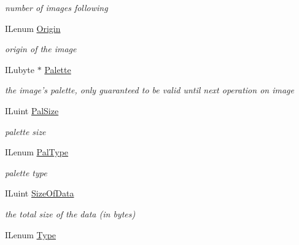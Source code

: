 \begin{DoxyCompactItemize}
\begin{DoxyCompactList}\small\item\em number of images following \end{DoxyCompactList}\item 
\hypertarget{struct_i_l_uinfo_a6f7c49ddc9cd419e2d2af24255df902a}{I\+Lenum \hyperlink{struct_i_l_uinfo_a6f7c49ddc9cd419e2d2af24255df902a}{Origin}}\label{struct_i_l_uinfo_a6f7c49ddc9cd419e2d2af24255df902a}

\begin{DoxyCompactList}\small\item\em origin of the image \end{DoxyCompactList}\item 
\hypertarget{struct_i_l_uinfo_ab520cff305ed9ee13d2eac7a87ac1d92}{I\+Lubyte $\ast$ \hyperlink{struct_i_l_uinfo_ab520cff305ed9ee13d2eac7a87ac1d92}{Palette}}\label{struct_i_l_uinfo_ab520cff305ed9ee13d2eac7a87ac1d92}

\begin{DoxyCompactList}\small\item\em the image's palette, only guaranteed to be valid until next operation on image \end{DoxyCompactList}\item 
\hypertarget{struct_i_l_uinfo_a728a63d4c8b857a800a4d19e250a8c4b}{I\+Luint \hyperlink{struct_i_l_uinfo_a728a63d4c8b857a800a4d19e250a8c4b}{Pal\+Size}}\label{struct_i_l_uinfo_a728a63d4c8b857a800a4d19e250a8c4b}

\begin{DoxyCompactList}\small\item\em palette size \end{DoxyCompactList}\item 
\hypertarget{struct_i_l_uinfo_ab091aab8d79003031a4e9957e85f43ca}{I\+Lenum \hyperlink{struct_i_l_uinfo_ab091aab8d79003031a4e9957e85f43ca}{Pal\+Type}}\label{struct_i_l_uinfo_ab091aab8d79003031a4e9957e85f43ca}

\begin{DoxyCompactList}\small\item\em palette type \end{DoxyCompactList}\item 
\hypertarget{struct_i_l_uinfo_ad3bfe4c8a6696b42835730f7b70327b7}{I\+Luint \hyperlink{struct_i_l_uinfo_ad3bfe4c8a6696b42835730f7b70327b7}{Size\+Of\+Data}}\label{struct_i_l_uinfo_ad3bfe4c8a6696b42835730f7b70327b7}

\begin{DoxyCompactList}\small\item\em the total size of the data (in bytes) \end{DoxyCompactList}\item 
\hypertarget{struct_i_l_uinfo_a437e4fc3b579e2e7879dedd0fd2ac587}{I\+Lenum \hyperlink{struct_i_l_uinfo_a437e4fc3b579e2e7879dedd0fd2ac587}{Type}}\label{struct_i_l_uinfo_a437e4fc3b579e2e7879dedd0fd2ac587}


\end{DoxyCompactItemize}
